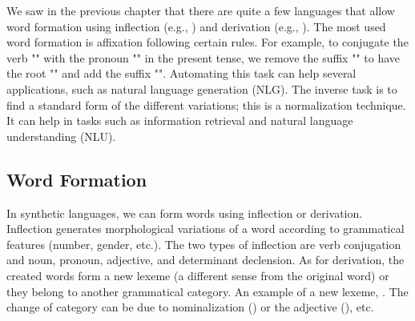 \documentclass{KBook}
\begin{document}
We saw in the previous chapter that there are quite a few languages that allow word formation using inflection (e.g., ) and derivation (e.g., ). 
The most used word formation is affixation following certain rules. 
For example, to conjugate the verb "" with the pronoun "" in the present tense, we remove the suffix "" to have the root "" and add the suffix "". 
Automating this task can help several applications, such as natural language generation (NLG). 
The inverse task is to find a standard form of the different variations; this is a normalization technique.
It can help in tasks such as information retrieval and natural language understanding (NLU).

\subsection{Word Formation}

In synthetic languages, we can form words using inflection or derivation. 
Inflection generates morphological variations of a word according to grammatical features (number, gender, etc.). 
The two types of inflection are verb conjugation and noun, pronoun, adjective, and determinant declension.
As for derivation, the created words form a new lexeme (a different sense from the original word) or they belong to another grammatical category. 
An example of a new lexeme,  .
The change of category can be due to nominalization () or the adjective (), etc.
\end{document}
